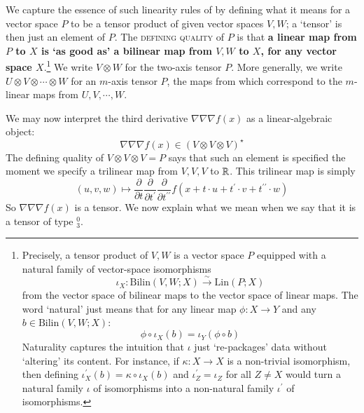 \documentclass[anon,12pt]{colt2021} %
\begin{document}
{            We capture the essence of such linearity rules of by defining what
            it means for a vector space $P$ to be a tensor product of given
            vector spaces $V, W$; a `tensor' is then just an element of $P$.
            The \textsc{defining quality} of $P$ is that \textbf{a linear map
            from $P$ to $X$ is `as good as' a bilinear map from $V, W$ to $X$,
            for any vector space $X$}.\footnote{
                Precisely, a tensor product of $V, W$ is a vector space $P$
                equipped with a natural family of vector-space isomorphisms $$
                \iota_X: \text{Bilin}(V,W;X) \xrightarrow{\sim} \text{Lin}(P;X)
                $$ from the vector space of bilinear maps to the vector space
                of linear maps.
                The word `natural' just means that for any linear map $\phi:
                X\to Y$ and any $b \in \text{Bilin}(V,W;X)$: $$ \phi \circ
                \iota_X(b) = \iota_Y(\phi \circ b) $$ Naturality captures the
                intuition that $\iota$ just `re-packages' data without
                `altering' its content.
                For instance, if $\kappa:X\to X$ is a non-trivial isomorphism,
                then defining $\iota^\prime_X(b) = \kappa \circ \iota_X(b)$ and
                $\iota^\prime_Z = \iota_Z$ for all $Z\neq X$ would turn a
                natural family $\iota$ of isomorphisms into a non-natural
                family $\iota^\prime$ of isomorphisms.
            }
            We write $V\otimes W$ for the two-axis tensor $P$.  More
            generally, we write $U\otimes V\otimes \cdots \otimes W$ for 
            an $m$-axis tensor $P$, the maps from which correspond to
            the $m$-linear maps from $U,V,\cdots,W$.

            We may now interpret the third derivative $\nabla\nabla\nabla f(x)$
            as a linear-algebraic object:
            $$
                \nabla\nabla\nabla f(x) \in  (V\otimes V\otimes V)^\star
            $$
            The defining quality of $V\otimes V\otimes V = P$ says that such an
            element is specified the moment we specify a trilinear map from $V,
            V, V$ to $\mathbb{R}$.  This trilinear map is simply 
            $$
                (u,v,w) \mapsto 
                \frac{\partial}{\partial t}
                \frac{\partial}{\partial t^{\prime}}
                \frac{\partial}{\partial t^{\prime\prime}}
                f(x + t                \cdot u 
                    + t^{\prime}       \cdot v
                    + t^{\prime\prime} \cdot w)
            $$
            So $\nabla\nabla\nabla f(x)$ is a tensor.  We now explain what we
            mean when we say that it is a tensor of type $^0_3$. 

}
\end{document}
